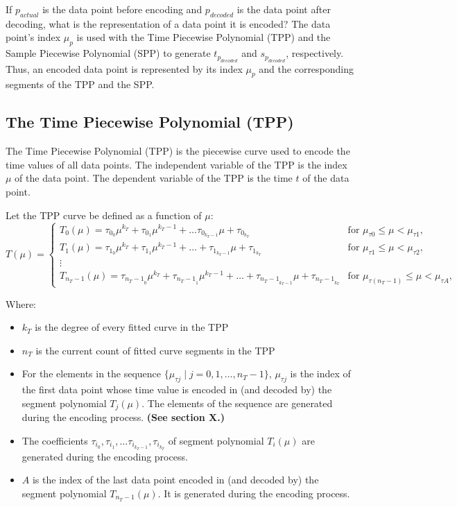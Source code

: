 \documentclass{article}
\begin{document}
If \(p_{actual}\) is the data point before encoding and \(p_{decoded}\) is the data point after decoding, what is the representation of a data point  it is encoded? The data point's index \(\mu_p\) is used with the Time Piecewise Polynomial (TPP) and the Sample Piecewise Polynomial (SPP) to generate  \(t_{p_{decoded}}\) and \(s_{p_{decoded}}\), respectively.
Thus, an encoded data point is represented by its index \(\mu_p\) and the corresponding segments of the TPP and the SPP.

\subsection{The Time Piecewise Polynomial (TPP)}
The Time Piecewise Polynomial (TPP) is the piecewise curve used to encode the time values of all data points. The independent variable of the TPP is the index \(\mu\) of the data point. The dependent variable of the TPP is the time \(t\) of the data point.

Let the TPP curve be defined as a function of $\mu$:
\begin{equation*} %
    \label{eq:T(\mu)}
T(\mu) = \begin{cases}
T_0(\mu) = \tau_{0_{0}}\mu^{k_T} + \tau_{0_{1}}\mu^{k_T-1} + \ldots \tau_{0_{k_T-1}}\mu + \tau_{0_{k_T}} & \text{for } \mu_{\tau 0} \leq \mu < \mu_{\tau 1}, \\
T_1(\mu) = \tau_{1_{0}}\mu^{k_T} + \tau_{1_{1}}\mu^{k_T-1} + \ldots + \tau_{1_{k_T-1}}\mu + \tau_{1_{k_T}} & \text{for } \mu_{\tau 1} \leq \mu < \mu_{\tau 2}, \\
\vdots & \\
T_{n_T-1}(\mu) = \tau_{{n_T-1}_{0}}\mu^{k_T} + \tau_{{n_T-1}_{1}}\mu^{k_T-1} + \ldots + \tau_{{n_T-1}_{k_T-1}}\mu + \tau_{{n_T-1}_{k_T}} & \text{for } \mu_{\tau (n_T-1)} \leq \mu < \mu_{\tau A},

\end{cases}
\end{equation*}

Where:
\begin{itemize}
    \item \(k_T\) is the degree of every fitted curve in the TPP
    \item \(n_T\) is the current count of fitted curve segments in the TPP
    \item For the elements in the sequence $\{\mu_{\tau j} \mid j = 0, 1, \ldots, n_T-1\}$, $\mu_{\tau j}$ is the index of the first data point whose time value is encoded in (and decoded by) the segment polynomial $T_j(\mu)$. The elements of the sequence are generated during the encoding process. \textbf{(See section X.)}
    \item The coefficients \(\tau_{i_{0}}, \tau_{i_{1}}, \ldots \tau_{{i}_{k_T-1}}, \tau_{{i}_{k_T}}\) of segment polynomial $T_i(\mu)$ are generated during the encoding process.
    \item \(A\) is the index of the last data point encoded in (and decoded by) the segment polynomial $T_{n_T-1}(\mu)$. It is generated during the encoding process.
\end{itemize}
\end{document}
